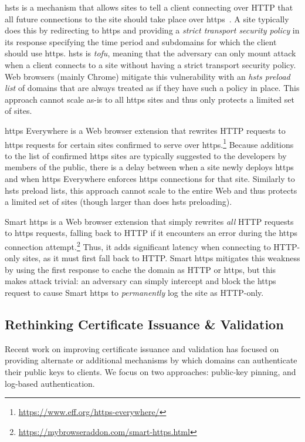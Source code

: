 \ac{hsts} is a mechanism that allows sites to tell a client connecting over HTTP
that all future connections to the site should take place over
\ac{https}~\cite{rfc6797}. A site typically does this by redirecting to
\ac{https} and providing a \emph{strict transport security policy} in its
response specifying the time period and subdomains for which the client should
use \ac{https}. \ac{hsts} is \emph{\ac{tofu}}, meaning that the adversary can
only mount  attack when a client connects to a site without having a
strict transport security policy. Web browsers (mainly Chrome) mitigate this
vulnerability with an \emph{\ac{hsts} preload list} of domains that are always
treated as if they have such a policy in place. This approach cannot scale as-is
to all \ac{https} sites and thus only protects a limited set of sites.

\ac{https} Everywhere is a Web browser extension that rewrites HTTP requests to
\ac{https} requests for certain sites confirmed to serve over
\ac{https}.\footnote{\url{https://www.eff.org/https-everywhere/}} Because
additions to the list of confirmed \ac{https} sites are typically suggested to
the developers by members of the public, there is a delay between when a site
newly deploys \ac{https} and when \ac{https} Everywhere enforces \ac{https}
connections for that site. Similarly to \ac{hsts} preload lists, this approach
cannot scale to the entire Web and thus protects a limited set of sites (though
larger than does \ac{hsts} preloading).

Smart \ac{https} is a Web browser extension that simply rewrites \emph{all} HTTP
requests to \ac{https} requests, falling back to HTTP if it encounters an error
during the \ac{https} connection
attempt.\footnote{\url{https://mybrowseraddon.com/smart-https.html}} Thus, it
adds significant latency when connecting to HTTP-only sites, as it must first
fall back to HTTP. Smart \ac{https} mitigates this weakness by using the first
response to cache the domain as HTTP or \ac{https}, but this makes 
attack trivial: an adversary can simply intercept and block the \ac{https}
request to cause Smart \ac{https} to \emph{permanently} log the site as
HTTP-only.

\subsection{Rethinking Certificate Issuance \& Validation}
\label{sec:background:issuance}

Recent work on improving certificate issuance and validation has focused on
providing alternate or additional mechanisms by which domains can authenticate
their public keys to clients. We focus on two approaches: public-key pinning,
and log-based authentication.

